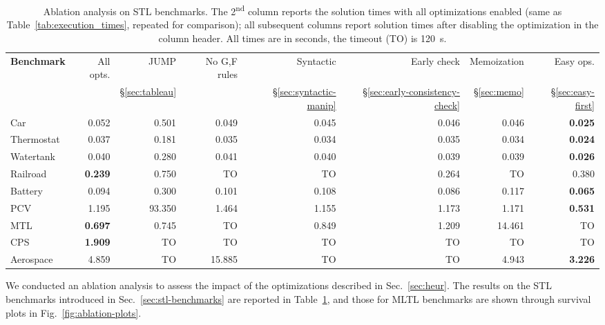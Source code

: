 \documentclass[acmsmall,screen]{acmart}
\begin{document}
\begin{table}[bt]
    \centering
    \caption{Ablation analysis on STL benchmarks.
    The 2\textsuperscript{nd} column reports the solution times with all optimizations enabled (same as Table~\ref{tab:execution_times}, repeated for comparison);
    all subsequent columns report solution times after disabling the optimization in the column header.
    All times are in seconds, the timeout (TO) is 120~s.}
    \label{tab:ablation-stl}
    \footnotesize
    \begin{tabular}{l r r r r r r r}
        \toprule
        \textbf{Benchmark} & All opts. & \textsf{JUMP} & No G,F rules & Syntactic & Early check & Memoization & Easy ops. \\
        & & §\ref{sec:tableau} & & §\ref{sec:syntactic-manip} &  §\ref{sec:early-consistency-check} & §\ref{sec:memo} & §\ref{sec:easy-first} \\
        \midrule
        Car \cite{BaeLee19} & 0.052 & 0.501 & 0.049 & 0.045 & 0.046 & 0.046 & \textbf{0.025} \\
        Thermostat \cite{BaeLee19} & 0.037 & 0.181 & 0.035 & 0.034 & 0.035 & 0.034 & \textbf{0.024} \\
        Watertank \cite{BaeLee19} &  0.040 & 0.280 & 0.041 & 0.040 & 0.039 & 0.039 & \textbf{0.026} \\
        Railroad \cite{BaeLee19} & \textbf{0.239} & 0.750 & TO & TO & 0.264 & TO & 0.380 \\
        Battery \cite{BaeLee19} & 0.094 & 0.300 & 0.101 & 0.108 & 0.086 & 0.117 & \textbf{0.065} \\
        PCV \cite{pcv} & 1.195 & 93.350 & 1.464 & 1.155 & 1.173 & 1.171 & \textbf{0.531} \\
        MTL \cite{Benchmarks_Temporal_Logic_Requirements} & \textbf{0.697} & 0.745 & TO & 0.849  & 1.209 & 14.461 & TO \\
        CPS \cite{BoufaiedJBBP21} &  \textbf{1.909} & TO & TO & TO & TO & TO & TO \\
        Aerospace & 4.859 & TO & 15.885 & TO & TO & 4.943 & \textbf{3.226} \\
        \bottomrule
    \end{tabular}
\end{table}

We conducted an ablation analysis to assess the impact of the optimizations described in Sec.~\ref{sec:heur}.
The results on the STL benchmarks introduced in Sec.~\ref{sec:stl-benchmarks} are reported in Table~\ref{tab:ablation-stl},
and those for MLTL benchmarks are shown through survival plots in Fig.~\ref{fig:ablation-plots}.
\end{document}
